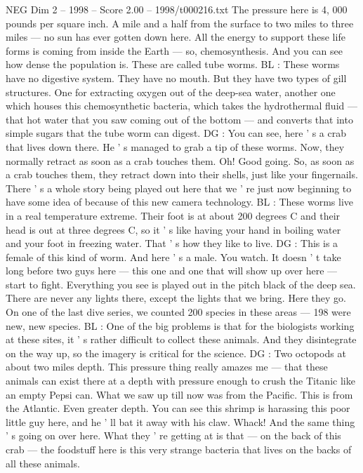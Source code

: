\begin{textsample}{NEG Dim 2 – 1998 – Score 2.00 – 1998/t000216.txt}
The pressure here is 4, 000 pounds per square inch.
A mile and a half from the surface to two miles to three miles — no sun has ever gotten down here.
All the energy to support these life forms is coming from inside the Earth — so, chemosynthesis.
And you can see how dense the population is.
These are called tube worms.
BL : These worms have no digestive system.
They have no mouth.
But they have two types of gill structures.
One for extracting oxygen out of the deep-sea water, another one which houses this chemosynthetic bacteria, which takes the hydrothermal fluid — that hot water that you saw coming out of the bottom — and converts that into simple sugars that the tube worm can digest.
DG : You can see, here ' s a crab that lives down there.
He ' s managed to grab a tip of these worms.
Now, they normally retract as soon as a crab touches them.
Oh!
Good going.
So, as soon as a crab touches them, they retract down into their shells, just like your fingernails.
There ' s a whole story being played out here that we ' re just now beginning to have some idea of because of this new camera technology.
BL : These worms live in a real temperature extreme.
Their foot is at about 200 degrees C and their head is out at three degrees C, so it ' s like having your hand in boiling water and your foot in freezing water.
That ' s how they like to live.
DG : This is a female of this kind of worm.
And here ' s a male.
You watch.
It doesn ' t take long before two guys here — this one and one that will show up over here — start to fight.
Everything you see is played out in the pitch black of the deep sea.
There are never any lights there, except the lights that we bring.
Here they go.
On one of the last dive series, we counted 200 species in these areas — 198 were new, new species.
BL : One of the big problems is that for the biologists working at these sites, it ' s rather difficult to collect these animals.
And they disintegrate on the way up, so the imagery is critical for the science.
DG : Two octopods at about two miles depth.
This pressure thing really amazes me — that these animals can exist there at a depth with pressure enough to crush the Titanic like an empty Pepsi can.
What we saw up till now was from the Pacific.
This is from the Atlantic.
Even greater depth.
You can see this shrimp is harassing this poor little guy here, and he ' ll bat it away with his claw.
Whack!
And the same thing ' s going on over here.
What they ' re getting at is that — on the back of this crab — the foodstuff here is this very strange bacteria that lives on the backs of all these animals.

\end{textsample}
